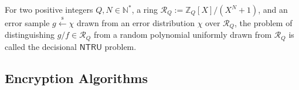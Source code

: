 \begin{definition}\label{def:dntru_prob}
For two positive integers \linebreak $Q,N \in \mathbb{N}^*$, a ring $\mathcal{R}_Q := \mathbb{Z}_Q[X] / (X^N + 1)$, and an error sample $g \xleftarrow{\text{s}} \chi$ drawn from an error distribution $\chi$ over $\mathcal{R}_Q$, the problem of distinguishing $g  /  f \in \mathcal{R}_Q$ from a random polynomial uniformly drawn from $\mathcal{R}_Q$ is called the decisional $\mathsf{NTRU}$ problem.
\end{definition}




\subsection{Encryption Algorithms}

